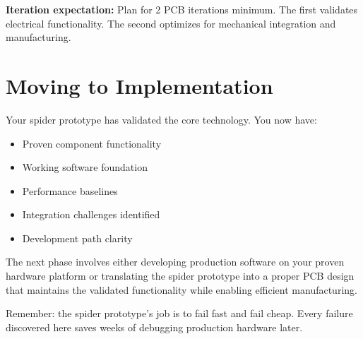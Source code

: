 \textbf{Iteration expectation:} Plan for 2 PCB iterations minimum. The first validates electrical functionality. The second optimizes for mechanical integration and manufacturing.

\section{Moving to Implementation}

Your spider prototype has validated the core technology. You now have:
\begin{itemize}
\item Proven component functionality
\item Working software foundation
\item Performance baselines
\item Integration challenges identified
\item Development path clarity
\end{itemize}

The next phase involves either developing production software on your proven hardware platform or translating the spider prototype into a proper PCB design that maintains the validated functionality while enabling efficient manufacturing.

Remember: the spider prototype's job is to fail fast and fail cheap. Every failure discovered here saves weeks of debugging production hardware later.